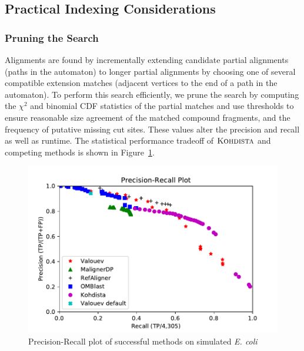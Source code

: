\subsection{Practical Indexing Considerations}
\subsubsection{Pruning the Search}

Alignments are found by incrementally extending candidate partial alignments (paths in the automaton) to longer partial alignments by choosing one of several compatible extension matches (adjacent vertices to the end of a path in the automaton).  To perform this search efficiently, we prune the search by computing the $\chi^2$ and binomial CDF statistics of the partial matches and use thresholds to ensure reasonable size agreement of the matched compound fragments, and the frequency of putative missing cut sites.  These values alter the precision and recall as well as runtime.  The statistical performance tradeoff of $\mbox{\rm \textsc{Kohdista}}$ and competing methods is shown in Figure~\ref{fig-pr}.

\begin{figure}[h]
  \centering

\includegraphics{gcsa_paper/content/figures/precrec}
  \caption{Precision-Recall plot of successful methods on simulated \emph{ E. coli}}
\label{fig-pr}
\end{figure}

